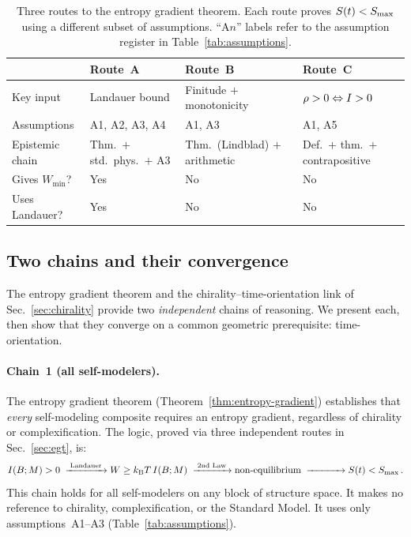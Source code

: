 \begin{table}[t]
  \centering
  \caption{Three routes to the entropy gradient theorem.  Each route
  proves $S(t) < S_{\max}$ using a different subset of assumptions.
  ``A$n$'' labels refer to the assumption register in
  Table~\ref{tab:assumptions}.}
  \label{tab:routes}
  \begin{tabular}{llll}
    \toprule
    & Route~A & Route~B & Route~C \\
    \midrule
    Key input
      & Landauer bound & Finitude $+$ monotonicity
      & $\rho > 0 \Leftrightarrow I > 0$ \\
    Assumptions
      & A1, A2, A3, A4 & A1, A3 & A1, A5 \\
    Epistemic chain
      & Thm.\ $+$ std.\ phys.\ $+$ A3
      & Thm.\ (Lindblad) $+$ arithmetic
      & Def.\ $+$ thm.\ $+$ contrapositive \\
    Gives $W_{\min}$?
      & Yes & No & No \\
    Uses Landauer?
      & Yes & No & No \\
    \bottomrule
  \end{tabular}
\end{table}

\subsection{Two chains and their convergence}\label{sec:selection-chain}

The entropy gradient theorem and the chirality--time-orientation link
of Sec.~\ref{sec:chirality} provide two \emph{independent} chains of
reasoning.  We present each, then show that they converge on a common
geometric prerequisite: time-orientation.

\paragraph{Chain~1 (all self-modelers).}
The entropy gradient theorem (Theorem~\ref{thm:entropy-gradient})
establishes that \emph{every} self-modeling composite requires an
entropy gradient, regardless of chirality or complexification.  The
logic, proved via three independent routes in Sec.~\ref{sec:egt}, is:
\begin{equation}
  \MI{B}{M} > 0
  \;\xrightarrow{\;\text{Landauer}\;}
  W \geq \kB T\,\MI{B}{M}
  \;\xrightarrow{\;\text{2nd Law}\;}
  \text{non-equilibrium}
  \;\xrightarrow{\phantom{\;\text{2nd Law}\;}}
  S(t) < \Smax \,.
  \label{eq:chain-1}
\end{equation}
This chain holds for all self-modelers on any block of structure
space.  It makes no reference to chirality, complexification, or
the Standard Model.  It uses only assumptions~A1--A3
(Table~\ref{tab:assumptions}).

